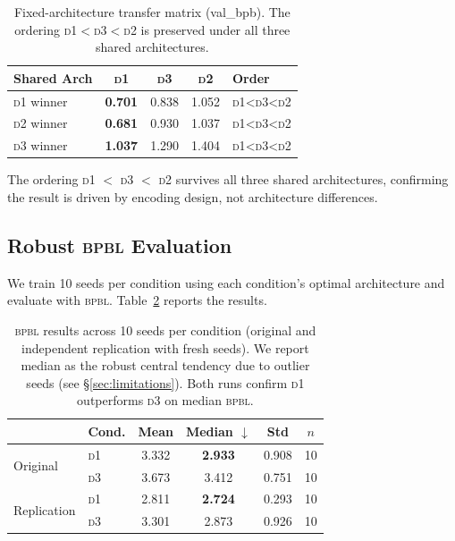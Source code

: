 \documentclass[11pt]{article}
\newcommand{\dOne}{\textsc{d1}}
\newcommand{\dTwo}{\textsc{d2}}
\newcommand{\dThree}{\textsc{d3}}
\newcommand{\bpbl}{\textsc{bpbl}}
\begin{document}
\begin{table}[t]
\centering
\small
\begin{tabular}{@{}lcccl@{}}
\toprule
\textbf{Shared Arch} & \textbf{\dOne{}} & \textbf{\dThree{}} & \textbf{\dTwo{}} & \textbf{Order} \\
\midrule
\dOne{} winner & \textbf{0.701} & 0.838 & 1.052 & \dOne{}<\dThree{}<\dTwo{} \\
\dTwo{} winner & \textbf{0.681} & 0.930 & 1.037 & \dOne{}<\dThree{}<\dTwo{} \\
\dThree{} winner & \textbf{1.037} & 1.290 & 1.404 & \dOne{}<\dThree{}<\dTwo{} \\
\bottomrule
\end{tabular}
\caption{Fixed-architecture transfer matrix (val\_bpb). The ordering \dOne{}$<$\dThree{}$<$\dTwo{} is preserved under all three shared architectures.}
\label{tab:transfer}
\end{table}

The ordering \dOne{} $<$ \dThree{} $<$ \dTwo{} survives all three shared architectures, confirming the result is driven by encoding design, not architecture differences.

\subsection{Robust \bpbl{} Evaluation}

We train 10 seeds per condition using each condition's optimal architecture and evaluate with \bpbl{}.
Table~\ref{tab:bpbl} reports the results.

\begin{table}[t]
\centering
\footnotesize
\begin{tabular}{@{}llcccc@{}}
\toprule
& \textbf{Cond.} & \textbf{Mean} & \textbf{Median} $\downarrow$ & \textbf{Std} & $n$ \\
\midrule
\multirow{2}{*}{Original} & \dOne{} & 3.332 & \textbf{2.933} & 0.908 & 10 \\
& \dThree{} & 3.673 & 3.412 & 0.751 & 10 \\
\midrule
\multirow{2}{*}{Replication} & \dOne{} & 2.811 & \textbf{2.724} & 0.293 & 10 \\
& \dThree{} & 3.301 & 2.873 & 0.926 & 10 \\
\bottomrule
\end{tabular}
\caption{\bpbl{} results across 10 seeds per condition (original and independent replication with fresh seeds). We report median as the robust central tendency due to outlier seeds (see \S\ref{sec:limitations}). Both runs confirm \dOne{} outperforms \dThree{} on median \bpbl{}.}
\label{tab:bpbl}
\end{table}
\end{document}

